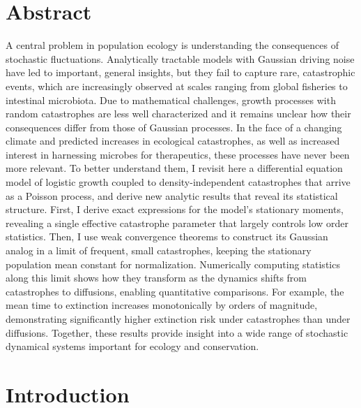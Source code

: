 \section{Abstract}
A central problem in population ecology is understanding the consequences of stochastic fluctuations.  Analytically tractable models with Gaussian driving noise have led to important, general insights, but they fail to capture rare, catastrophic events, which are increasingly observed at scales ranging from global fisheries to intestinal microbiota.  Due to mathematical challenges, growth processes with random catastrophes are less well characterized and it remains unclear how their consequences differ from those of Gaussian processes.  In the face of a changing climate and predicted increases in ecological catastrophes, as well as increased interest in harnessing microbes for therapeutics, these processes have never been more relevant.  To better understand them, I revisit here a differential equation model of logistic growth coupled to density-independent catastrophes that arrive as a Poisson process, and derive new analytic results that reveal its statistical structure.  First, I derive exact expressions for the model's stationary moments, revealing a single effective catastrophe parameter that largely controls low order statistics.  Then, I use weak convergence theorems to construct its Gaussian analog in a limit of frequent, small catastrophes, keeping the stationary population mean constant for normalization.  Numerically computing statistics along this limit shows how they transform as the dynamics shifts from catastrophes to diffusions, enabling quantitative comparisons.  For example, the mean time to extinction increases monotonically by orders of magnitude, demonstrating significantly higher extinction risk under catastrophes than under diffusions. Together, these results provide insight into a wide range of stochastic dynamical systems important for ecology and conservation.


\section{Introduction}


